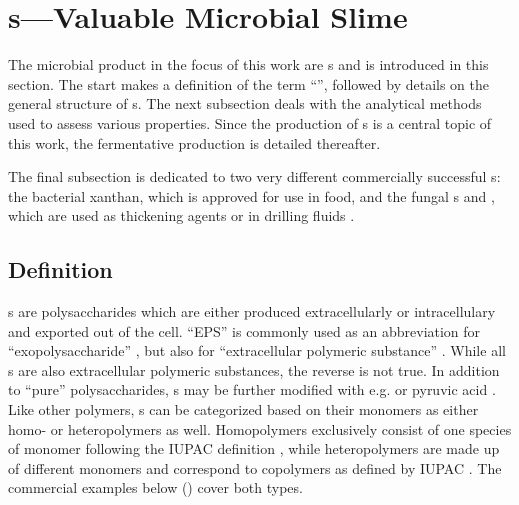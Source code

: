 \section{\EPS{}s---Valuable Microbial Slime\label{sec-intro-eps}}
The microbial product in the focus of this work are \eps{}s and is introduced in this section. The start makes a definition of the term \enquote{\eps{}}, followed by details on the general structure of \eps{}s. The next subsection deals with the analytical methods used to assess various \eps{} properties. Since the production of \eps{}s is a central topic of this work, the fermentative production is detailed thereafter.

The final subsection is dedicated to two very different commercially successful \eps{}s: the bacterial \eps{} xanthan, which is approved for use in food, and the fungal \eps{}s \scl{} and \shz{}, which are used as thickening agents or in drilling fluids \cite{Schmid2011}.

\subsection{Definition\label{subsec-intro-eps-def}}
\EPS{}s are polysaccharides which are either produced extracellularly or intracellulary and exported out of the cell. \enquote{EPS} is commonly used as an abbreviation for \enquote{exopolysaccharide} \cite{Kumar1998, Sutherland2001, Broadbent2003, RuasMadiedo2005, Freitas2011}, but also for \enquote{extracellular polymeric substance} \cite{Beech1991, Foster2000, Geyik2016}. While all \eps{}s are also extracellular polymeric substances, the reverse is not true.
In addition to \enquote{pure} polysaccharides, \eps{}s may be further modified with e.g. \acet{} or pyruvic acid \cite{Jansson1975}. Like other polymers, \eps{}s can be categorized based on their monomers as either homo- or heteropolymers as well. Homopolymers exclusively consist of one species of monomer following the IUPAC definition \cite{IUPACgoldbook}, while heteropolymers are made up of different monomers and correspond to copolymers as defined by IUPAC \cite{IUPACgoldbook}. The commercial examples below () cover both types.

